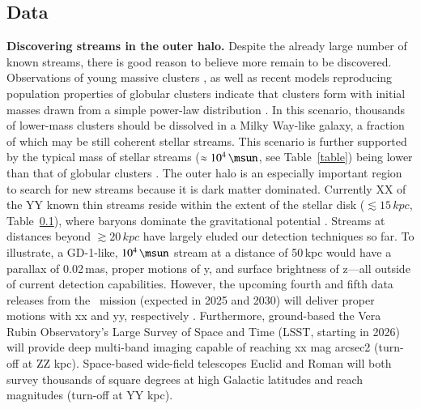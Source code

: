 \documentclass[final,5p,times,twocolumn,authoryear]{elsarticle}
\begin{document}
\subsection{Data}
\textbf{Discovering streams in the outer halo.} Despite the already large number of known streams, there is good reason to believe more remain to be discovered.
Observations of young massive clusters \citep[e.g.,][]{portegies-zwart:2010}, as well as recent models reproducing population properties of globular clusters indicate that clusters form with initial masses drawn from a simple power-law distribution \citep[e.g.,][]{choksi:2018,chen:2023}.
In this scenario, thousands of lower-mass clusters should be dissolved in a Milky Way-like galaxy, a fraction of which may be still coherent stellar streams.
This scenario is further supported by the typical mass of stellar streams ($\approx10^4\,\unit{\msun}$, see Table~\ref{table}) being lower than that of globular clusters \citep[$\approx10^5\,\unit{\msun}$,][]{baumgardt}.
The outer halo is an especially important region to search for new streams because it is dark matter dominated.
Currently XX of the YY known thin streams reside within the extent of the stellar disk ($\lesssim15\,\unit{kpc}$, Table~\ref{}), where baryons dominate the gravitational potential \citep[e.g.,][]{mcmillan:2017}.
Streams at distances beyond $\gtrsim20\,\unit{kpc}$ have largely eluded our detection techniques so far.
To illustrate, a GD-1-like, $10^4\,\unit{\msun}$ stream at a distance of 50\,\unit{kpc} would have a parallax of 0.02\,\unit{mas}, proper motions of y, and surface brightness of z---all outside of current detection capabilities.
However, the upcoming fourth and fifth data releases from the \gaia\ mission (expected in 2025 and 2030) will deliver proper motions with xx and yy, respectively \citep{forecast}.
Furthermore, ground-based the Vera Rubin Observatory's Large Survey of Space and Time (LSST, starting in 2026) will provide deep multi-band imaging capable of reaching xx mag arcsec2 \citep{ivezic:2008} (turn-off at ZZ kpc).
Space-based wide-field telescopes Euclid \citep[launched in 2023]{laureijs:2011} and Roman \citep[to launch in 2027]{spergel:2013} will both survey thousands of square degrees at high Galactic latitudes and reach magnitudes (turn-off at YY kpc).
\end{document}
